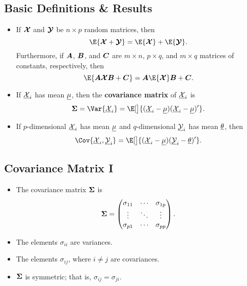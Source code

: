 \subsection*{Basic Definitions \& Results}
\begin{itemize}
      \item If $ \bm{\mathcal{X}} $ and $ \bm{\mathcal{Y}} $ be $ n\times p $ random matrices, then
            \[ \E{\RMatrix{X}+\RMatrix{Y}}=\E{\RMatrix{X}}+\E{\RMatrix{Y}}. \]
            Furthermore, if $ \bm{A} $, $ \bm{B} $, and $ \bm{C} $ are $ m\times n $, $ p\times q $, and $ m\times q $ matrices of constants, respectively,
            then
            \[ \E{\Matrix{A}\RMatrix{X}\Matrix{B}+\Matrix{C}}=\Matrix{A}\E{\RMatrix{X}}\Matrix{B}+\Matrix{C}. \]
      \item If $ \underline{\mathcal{X}}_i $ has mean $ \underline{\mu} $, then the \textbf{covariance matrix} of $ \underline{\mathcal{X}}_i $ is
            \[ \Matrix{\Sigma}=\Var{\RVector{X}_i}=\E[\big]{(\RVector{X}_i-\Vector{\mu})(\RVector{X}_i-\Vector{\mu})'}. \]
      \item If $ p $-dimensional $ \underline{\mathcal{X}}_i $ has mean $ \underline{\mu} $ and $ q $-dimensional $ \underline{\mathcal{Y}}_i $ has mean $ \underline{\theta} $,
            then
            \[ \Cov{\RVector{X}_i,\RVector{Y}_i}=\E[\big]{(\RVector{X}_i-\Vector{\mu})(\RVector{Y}_i-\Vector{\theta})'}. \]
\end{itemize}
\subsection*{Covariance Matrix I}
\begin{itemize}
      \item The covariance matrix $ \bm{\Sigma} $ is
            \[ \bm{\Sigma}=\begin{pmatrix}
                        \sigma_{11} & \cdots & \sigma_{1p} \\
                        \vdots      & \ddots & \vdots      \\
                        \sigma_{p1} & \cdots & \sigma_{pp}
                  \end{pmatrix}. \]
      \item The elements $ \sigma_{ii} $ are variances.
      \item The elements $ \sigma_{ij} $, where $ i\ne j $ are covariances.
      \item $ \bm{\Sigma} $ is symmetric; that is, $ \sigma_{ij}=\sigma_{ji} $.
\end{itemize}
